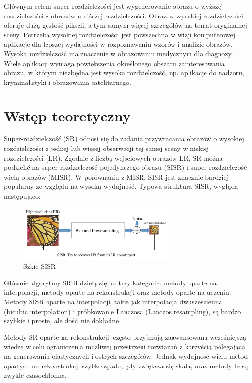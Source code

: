 \documentclass[a4paper,11pt, notitlepage ]{article}
\begin{document}
	Głównym celem super-rozdzielczości jest wygenerowanie obrazu o wyższej rozdzielczości z obrazów o niższej rozdzielczości. Obraz w wysokiej rozdzielczości oferuje dużą gęstość pikseli, a tym samym więcej szczegółów na temat oryginalnej sceny. Potrzeba wysokiej rozdzielczości jest powszechna w wizji komputerowej	aplikacje dla lepszej wydajności w rozpoznawaniu wzorów i analizie obrazów. Wysoka rozdzielczość ma znaczenie w obrazowaniu medycznym dla diagnozy. Wiele aplikacji wymaga powiększenia określonego obszaru zainteresowania obrazu, w którym niezbędna jest wysoka rozdzielczość, np. aplikacje do nadzoru, kryminalistyki i obrazowania satelitarnego.
	\section{Wstęp teoretyczny}
	Super-rozdzielczość (SR) odnosi się do zadania przywracania obrazów o wysokiej rozdzielczości z jednej lub więcej obserwacji tej samej sceny w niskiej rozdzielczości (LR). Zgodnie z liczbą wejściowych obrazów LR, SR można podzielić na super-rozdzielczość pojedynczego obrazu (SISR) i super-rozdzielczość wielu obrazów (MISR). W porównaniu z MISR, SISR jest znacznie bardziej popularny ze względu na wysoką wydajność. Typowa struktura SISR, wygłąda następująco:
	\begin{figure}[h]
	\centering
	\includegraphics[width=0.7\textwidth]{sisr.png}
	\caption{Szkic SISR}
	\label{fig:mesh1}
	\end{figure}
	\newpage
	Głównie algorytmy SISR dzielą się na trzy kategorie: metody oparte na interpolacji, metody oparte na rekonstrukcji oraz metody oparte na uczeniu. Metody SISR oparte na interpolacji, takie jak interpolacja dwusześcienna (bicubic  interpolation) i próbkowanie Lanczosa (Lanczos resampling), są bardzo szybkie i proste, ale dość nie dokładne.
	  
	 Metody SR oparte na rekonstrukcji,  często przyjmują zaawansowaną wcześniejszą wiedzę w celu ograniczenia możliwej przestrzeni rozwiązań z korzyścią polegającą na generowaniu elastycznych i ostrych szczegółów. Jednak wydajność wielu metod opartych na rekonstrukcji szybko spada, gdy zwiększa się skala, oraz metody te są zwykle czasochłonne.
	 
\end{document}
